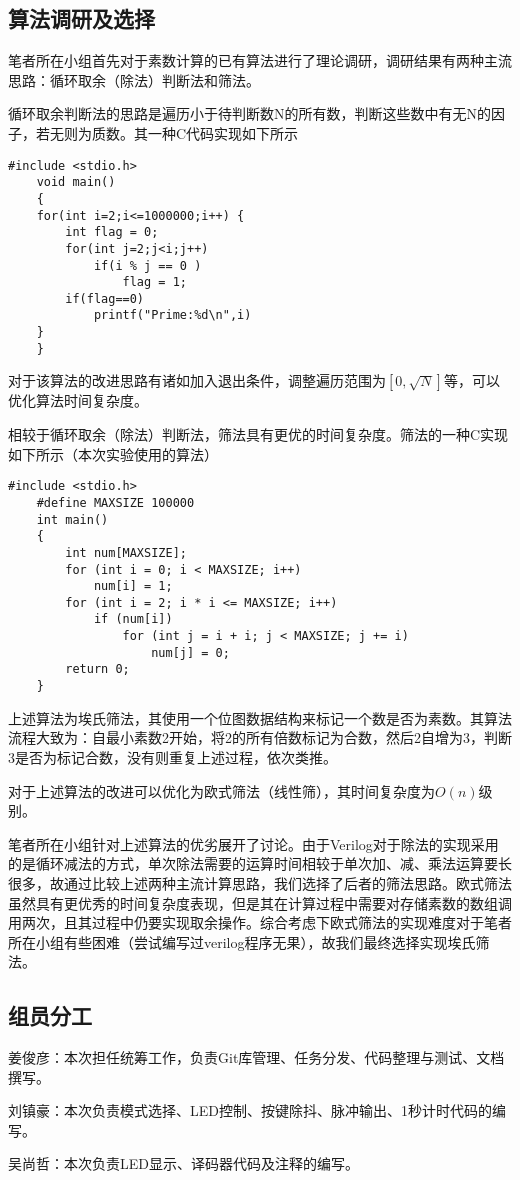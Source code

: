 	\subsection{算法调研及选择}
	笔者所在小组首先对于素数计算的已有算法进行了理论调研，调研结果有两种主流思路：循环取余（除法）判断法和筛法。
	
	循环取余判断法的思路是遍历小于待判断数N的所有数，判断这些数中有无N的因子，若无则为质数。其一种C代码实现如下所示
	
	\begin{lstlisting}[style=c]
	#include <stdio.h>
	void main()
	{
	for(int i=2;i<=1000000;i++) {
		int flag = 0;
		for(int j=2;j<i;j++)
			if(i % j == 0 )
				flag = 1;
		if(flag==0)
			printf("Prime:%d\n",i)
	}
	}
	\end{lstlisting}
	
	对于该算法的改进思路有诸如加入退出条件，调整遍历范围为$[0,\sqrt{N}]$等，可以优化算法时间复杂度。
	
	相较于循环取余（除法）判断法，筛法具有更优的时间复杂度。筛法的一种C实现如下所示（本次实验使用的算法）
	
	\begin{lstlisting}[style=c]
	#include <stdio.h>
	#define MAXSIZE 100000
	int main()
	{
		int num[MAXSIZE];
		for (int i = 0; i < MAXSIZE; i++)
			num[i] = 1;
		for (int i = 2; i * i <= MAXSIZE; i++)
			if (num[i])
				for (int j = i + i; j < MAXSIZE; j += i)
					num[j] = 0;
		return 0;
	}
	\end{lstlisting}
	
	上述算法为埃氏筛法，其使用一个位图数据结构来标记一个数是否为素数。其算法流程大致为：自最小素数2开始，将2的所有倍数标记为合数，然后2自增为3，判断3是否为标记合数，没有则重复上述过程，依次类推。
	
	对于上述算法的改进可以优化为欧式筛法（线性筛），其时间复杂度为$O(n)$级别。
	
	笔者所在小组针对上述算法的优劣展开了讨论。由于Verilog对于除法的实现采用的是循环减法的方式，单次除法需要的运算时间相较于单次加、减、乘法运算要长很多，故通过比较上述两种主流计算思路，我们选择了后者的筛法思路。欧式筛法虽然具有更优秀的时间复杂度表现，但是其在计算过程中需要对存储素数的数组调用两次，且其过程中仍要实现取余操作。综合考虑下欧式筛法的实现难度对于笔者所在小组有些困难（尝试编写过verilog程序无果），故我们最终选择实现埃氏筛法。
	\subsection{组员分工}
	\begin{compactitem}
		\item 姜俊彦：本次担任统筹工作，负责Git库管理、任务分发、代码整理与测试、文档撰写。
		\item 刘镇豪：本次负责模式选择、LED控制、按键除抖、脉冲输出、1秒计时代码的编写。
		\item 吴尚哲：本次负责LED显示、译码器代码及注释的编写。
	\end{compactitem}
